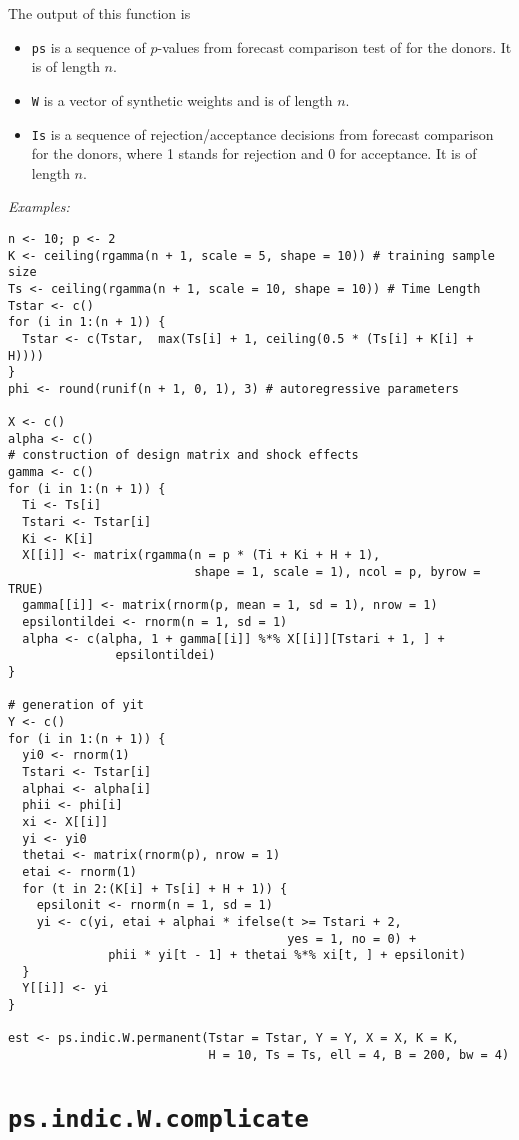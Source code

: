 \documentclass[12pt]{article}
\begin{document}
 The output of this function is
 \begin{itemize}
 	\item \texttt{ps} is a sequence of $p$-values from forecast comparison test of   for the donors. It is of length $n$.
 	\item \texttt{W} is a vector of synthetic weights and is of length $n$.
 	\item  \texttt{Is} is a sequence of rejection/acceptance decisions from forecast comparison for the donors, where 1 stands for rejection and 0 for acceptance. It is of length $n$.
 \end{itemize}
 
 
 \emph{Examples:}
 
 \begin{verbatim}
n <- 10; p <- 2
K <- ceiling(rgamma(n + 1, scale = 5, shape = 10)) # training sample size
Ts <- ceiling(rgamma(n + 1, scale = 10, shape = 10)) # Time Length
Tstar <- c()
for (i in 1:(n + 1)) {
  Tstar <- c(Tstar,  max(Ts[i] + 1, ceiling(0.5 * (Ts[i] + K[i] + H))))
}
phi <- round(runif(n + 1, 0, 1), 3) # autoregressive parameters

X <- c()
alpha <- c()
# construction of design matrix and shock effects
gamma <- c()
for (i in 1:(n + 1)) {
  Ti <- Ts[i]
  Tstari <- Tstar[i]
  Ki <- K[i]
  X[[i]] <- matrix(rgamma(n = p * (Ti + Ki + H + 1),
                          shape = 1, scale = 1), ncol = p, byrow = TRUE) 
  gamma[[i]] <- matrix(rnorm(p, mean = 1, sd = 1), nrow = 1)
  epsilontildei <- rnorm(n = 1, sd = 1)
  alpha <- c(alpha, 1 + gamma[[i]] %*% X[[i]][Tstari + 1, ] +
               epsilontildei)
}

# generation of yit
Y <- c()
for (i in 1:(n + 1)) {
  yi0 <- rnorm(1)
  Tstari <- Tstar[i]
  alphai <- alpha[i]
  phii <- phi[i]
  xi <- X[[i]]
  yi <- yi0
  thetai <- matrix(rnorm(p), nrow = 1)
  etai <- rnorm(1)
  for (t in 2:(K[i] + Ts[i] + H + 1)) {
    epsilonit <- rnorm(n = 1, sd = 1)
    yi <- c(yi, etai + alphai * ifelse(t >= Tstari + 2, 
                                       yes = 1, no = 0) +
              phii * yi[t - 1] + thetai %*% xi[t, ] + epsilonit)
  }
  Y[[i]] <- yi
}

est <- ps.indic.W.permanent(Tstar = Tstar, Y = Y, X = X, K = K, 
                            H = 10, Ts = Ts, ell = 4, B = 200, bw = 4)
 \end{verbatim}
 
 \section{\texttt{ps.indic.W.complicate}}
 
\end{document}
